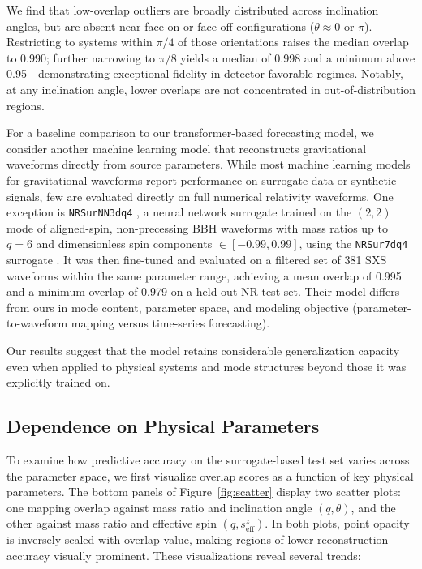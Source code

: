 \documentclass[12pt]{iopart}
\begin{document}
We find that low-overlap outliers are broadly distributed across inclination angles, but are absent near face-on or face-off configurations ($\theta \approx 0 \text{ or } \pi$). Restricting to systems within $\pi/4$ of those orientations raises the median overlap to 0.990; further narrowing to $\pi/8$ yields a median of 0.998 and a minimum above 0.95—demonstrating exceptional fidelity in detector-favorable regimes. Notably, at any inclination angle, lower overlaps are not concentrated in out-of-distribution regions. 

For a baseline comparison to our transformer-based forecasting model, we consider another machine learning model that reconstructs gravitational waveforms directly from source parameters. While most machine learning models for gravitational waveforms report performance on surrogate data or synthetic signals, few are evaluated directly on full numerical relativity waveforms. One exception is \texttt{NRSurNN3dq4} \cite{GramaxoFreitas:2024bpk}, a neural network surrogate trained on the $(2,2)$ mode of aligned-spin, non-precessing BBH waveforms with mass ratios up to $q=6$ and dimensionless spin components $\in [-0.99,0.99]$, using the \texttt{NRSur7dq4} surrogate \cite{Varma:2019csw}. It was then fine-tuned and evaluated on a filtered set of 381 SXS waveforms within the same parameter range, achieving a mean overlap of 0.995 and a minimum overlap of 0.979 on a held-out NR test set. Their model differs from ours in mode content, parameter space, and modeling objective (parameter-to-waveform mapping versus time-series forecasting).


Our results suggest that the model retains considerable generalization capacity even when applied to physical systems and mode structures beyond those it was explicitly trained on.

\subsection{Dependence on Physical Parameters}

To examine how predictive accuracy on the surrogate-based test set varies across the parameter space, we first visualize overlap scores as a function of key physical parameters. The bottom panels of Figure~\ref{fig:scatter} display two scatter plots: one mapping overlap against mass ratio and inclination angle $(q,\theta)$, and the other against mass ratio and effective spin $(q,s_{\mathrm{eff}}^z)$. In both plots, point opacity is inversely scaled with overlap value, making regions of lower reconstruction accuracy visually prominent. These visualizations reveal several trends:
\end{document}

